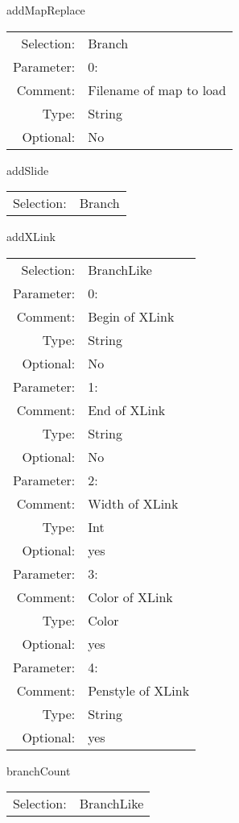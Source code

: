 \item addMapReplace\\
\begin{tabular}{rl}
  Selection: & Branch\\
   Parameter: &  0:\\
        Comment: & Filename of map to load\\
           Type: & String\\
       Optional: &  No\\
\end{tabular}

\item addSlide\\
\begin{tabular}{rl}
  Selection: & Branch\\
\end{tabular}

\item addXLink\\
\begin{tabular}{rl}
  Selection: & BranchLike\\
   Parameter: &  0:\\
        Comment: & Begin of XLink\\
           Type: & String\\
       Optional: &  No\\
   Parameter: &  1:\\
        Comment: & End of XLink\\
           Type: & String\\
       Optional: &  No\\
   Parameter: &  2:\\
        Comment: & Width of XLink\\
           Type: & Int\\
       Optional: &  yes\\
   Parameter: &  3:\\
        Comment: & Color of XLink\\
           Type: & Color\\
       Optional: &  yes\\
   Parameter: &  4:\\
        Comment: & Penstyle of XLink\\
           Type: & String\\
       Optional: &  yes\\
\end{tabular}

\item branchCount\\
\begin{tabular}{rl}
  Selection: & BranchLike\\
\end{tabular}

